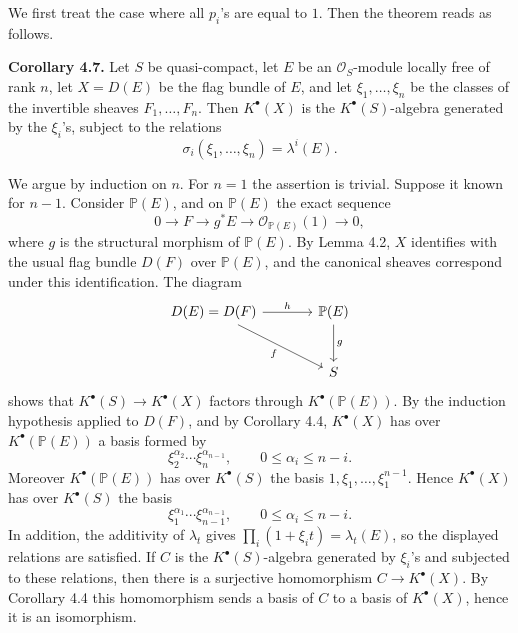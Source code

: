 We first treat the case where all \(p_i\)'s are equal to \(1\). Then the theorem reads as follows.

\textbf{Corollary 4.7.} Let \(S\) be quasi-compact, let \(E\) be an \(\mathcal O_S\)-module locally free of rank \(n\), let \(X=D(E)\) be the flag bundle of \(E\), and let \(\xi_1,\ldots,\xi_n\) be the classes of the invertible sheaves \(F_1,\ldots,F_n\). Then \(K^\bullet(X)\) is the \(K^\bullet(S)\)-algebra generated by the \(\xi_i\)'s, subject to the relations
\[
  \sigma_i(\xi_1,\ldots,\xi_n)=\lambda^i(E).
\]

We argue by induction on \(n\). For \(n=1\) the assertion is trivial. Suppose it known for \(n-1\). Consider \(\mathbb P(E)\), and on \(\mathbb P(E)\) the exact sequence
\[
  0\longrightarrow F\longrightarrow g^*E\longrightarrow \mathcal O_{\mathbb P(E)}(1)\longrightarrow 0,
\]
where \(g\) is the structural morphism of \(\mathbb P(E)\). By Lemma 4.2, \(X\) identifies with the usual flag bundle \(D(F)\) over \(\mathbb P(E)\), and the canonical sheaves correspond under this identification. The diagram
\[
\begin{tikzcd}[column sep=large,row sep=large]
D(E)=D(F) \arrow[r,"h"] \arrow[dr,"f"'] & \mathbb P(E) \arrow[d,"g"]\\
& S
\end{tikzcd}
\]
shows that \(K^\bullet(S)\to K^\bullet(X)\) factors through \(K^\bullet(\mathbb P(E))\). By the induction hypothesis applied to \(D(F)\), and by Corollary 4.4, \(K^\bullet(X)\) has over \(K^\bullet(\mathbb P(E))\) a basis formed by
\[
  \xi_2^{\alpha_2}\cdots \xi_n^{\alpha_{n-1}},
  \qquad 0\leq \alpha_i\leq n-i.
\]
Moreover \(K^\bullet(\mathbb P(E))\) has over \(K^\bullet(S)\) the basis \(1,\xi_1,\ldots,\xi_1^{n-1}\). Hence \(K^\bullet(X)\) has over \(K^\bullet(S)\) the basis
\[
  \xi_1^{\alpha_1}\cdots \xi_{n-1}^{\alpha_{n-1}},
  \qquad 0\leq \alpha_i\leq n-i.
\]
In addition, the additivity of \(\lambda_t\) gives \(\prod_i(1+\xi_i t)=\lambda_t(E)\), so the displayed relations are satisfied. If \(C\) is the \(K^\bullet(S)\)-algebra generated by \(\xi_i\)'s and subjected to these relations, then there is a surjective homomorphism \(C\to K^\bullet(X)\). By Corollary 4.4 this homomorphism sends a basis of \(C\) to a basis of \(K^\bullet(X)\), hence it is an isomorphism.

